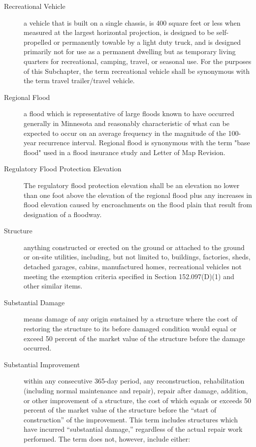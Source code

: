 \begin{description}
    \item[Recreational Vehicle] a vehicle that is built on a single chassis, is 400 square feet or less when measured at the largest horizontal projection, is designed to be self-propelled or permanently towable by a light duty truck, and is designed primarily not for use as a permanent dwelling but as temporary living quarters for recreational, camping, travel, or seasonal use. For the purposes of this Subchapter, the term recreational vehicle shall be synonymous with the term travel trailer/travel vehicle.
    \item[Regional Flood] a flood which is representative of large floods known to have occurred generally in Minnesota and reasonably characteristic of what can be expected to occur on an average frequency in the magnitude of the 100-year recurrence interval. Regional flood is synonymous with the term "base flood" used in a flood insurance study and Letter of Map Revision.
    \item[Regulatory Flood Protection Elevation] The regulatory flood protection elevation shall be an elevation no lower than one foot above the elevation of the regional flood plus any increases in flood elevation caused by encroachments on the flood plain that result from designation of a floodway.
    \item[Structure] anything constructed or erected on the ground or attached to the ground or on-site utilities, including, but not limited to, buildings, factories, sheds, detached garages, cabins, manufactured homes, recreational vehicles not meeting the exemption criteria specified in Section 152.097(D)(1) and other similar items.
    \item[Substantial Damage] means damage of any origin sustained by a structure where the cost of restoring the structure to its before damaged condition would equal or exceed 50 percent of the market value of the structure before the damage occurred.
    \item[Substantial Improvement] within any consecutive 365-day period, any reconstruction, rehabilitation (including normal maintenance and repair), repair after damage, addition, or other improvement of a structure, the cost of which equals or exceeds 50 percent of the market value of the structure before the “start of construction” of the improvement. This term includes structures which have incurred “substantial damage,” regardless of the actual repair work performed. The term does not, however, include either:
        \begin{enumerate}[{\indent}a)]

\end{enumerate}
\end{description}
